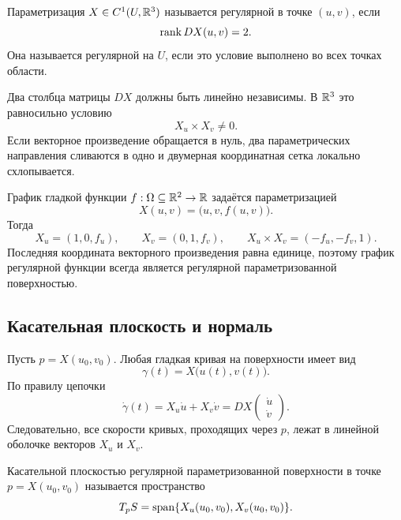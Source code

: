 \begin{definition}
Параметризация \(X\in C^1(U,\mathbb{R}^3)\) называется регулярной в точке \((u,v)\), если
\begin{equation}
\label{eq:surface-regularity}
\operatorname{rank} D X(u,v)=2.
\end{equation}
Она называется регулярной на \(U\), если это условие выполнено во всех точках области.
\end{definition}

Два столбца матрицы \(D X\) должны быть линейно независимы. В \(\mathbb{R}^3\) это равносильно условию
\begin{equation}
\label{eq:surface-regularity-cross-product}
X_u\times X_v\neq0.
\end{equation}
Если векторное произведение обращается в нуль, два параметрических направления сливаются в одно и двумерная координатная сетка локально схлопывается.

\begin{example}
График гладкой функции \(f:\Omega\subseteq\mathbb{R}^2\to\mathbb{R}\) задаётся параметризацией
\begin{equation}
\label{eq:graph-surface}
X(u,v)=\bigl(u,v,f(u,v)\bigr).
\end{equation}
Тогда
\[
X_u=(1,0,f_u),
\qquad
X_v=(0,1,f_v),
\qquad
X_u\times X_v=(-f_u,-f_v,1).
\]
Последняя координата векторного произведения равна единице, поэтому график регулярной функции всегда является регулярной параметризованной поверхностью.
\end{example}

\subsection{Касательная плоскость и нормаль}

Пусть \(p=X(u_0,v_0)\). Любая гладкая кривая на поверхности имеет вид
\[
\gamma(t)=X\bigl(u(t),v(t)\bigr).
\]
По правилу цепочки
\begin{equation}
\label{eq:surface-curve-velocity}
\dot\gamma(t)
=X_u\dot u+X_v\dot v
=D X\begin{pmatrix}\dot u\\ \dot v\end{pmatrix}.
\end{equation}
Следовательно, все скорости кривых, проходящих через \(p\), лежат в линейной оболочке векторов \(X_u\) и \(X_v\).

\begin{definition}
Касательной плоскостью регулярной параметризованной поверхности в точке \(p=X(u_0,v_0)\) называется пространство
\begin{equation}
\label{eq:surface-tangent-plane}
T_pS
=\operatorname{span}\{X_u(u_0,v_0),X_v(u_0,v_0)\}.
\end{equation}
\end{definition}

